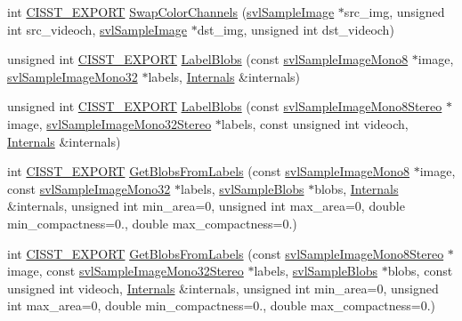 \begin{DoxyCompactItemize}
\item 
int \hyperlink{cmn_export_macros_8h_a99393e0c3ac434b2605235bbe20684f8}{C\+I\+S\+S\+T\+\_\+\+E\+X\+P\+O\+R\+T} \hyperlink{namespacesvl_image_processing_a454ae19ad32cfb837dd13169a01d5d99}{Swap\+Color\+Channels} (\hyperlink{classsvl_sample_image}{svl\+Sample\+Image} $\ast$src\+\_\+img, unsigned int src\+\_\+videoch, \hyperlink{classsvl_sample_image}{svl\+Sample\+Image} $\ast$dst\+\_\+img, unsigned int dst\+\_\+videoch)
\item 
unsigned int \hyperlink{cmn_export_macros_8h_a99393e0c3ac434b2605235bbe20684f8}{C\+I\+S\+S\+T\+\_\+\+E\+X\+P\+O\+R\+T} \hyperlink{namespacesvl_image_processing_ab67a8fcff51b4dbddda68a51697ea222}{Label\+Blobs} (const \hyperlink{svl_sample_image_types_8h_a812ff42c7181179f558b68c43eeacee5}{svl\+Sample\+Image\+Mono8} $\ast$image, \hyperlink{svl_sample_image_types_8h_ac5d9d107eabb65b55f67d2a70ccf2cd6}{svl\+Sample\+Image\+Mono32} $\ast$labels, \hyperlink{classsvl_image_processing_1_1_internals}{Internals} \&internals)
\item 
unsigned int \hyperlink{cmn_export_macros_8h_a99393e0c3ac434b2605235bbe20684f8}{C\+I\+S\+S\+T\+\_\+\+E\+X\+P\+O\+R\+T} \hyperlink{namespacesvl_image_processing_a03a2903ed508d4db0f8d21517d03344e}{Label\+Blobs} (const \hyperlink{svl_sample_image_types_8h_a40d6fa6c50215a4f52a8027a42eef1d9}{svl\+Sample\+Image\+Mono8\+Stereo} $\ast$image, \hyperlink{svl_sample_image_types_8h_a31510d38b03e3baeedb79e24fe3c7d0b}{svl\+Sample\+Image\+Mono32\+Stereo} $\ast$labels, const unsigned int videoch, \hyperlink{classsvl_image_processing_1_1_internals}{Internals} \&internals)
\item 
int \hyperlink{cmn_export_macros_8h_a99393e0c3ac434b2605235bbe20684f8}{C\+I\+S\+S\+T\+\_\+\+E\+X\+P\+O\+R\+T} \hyperlink{namespacesvl_image_processing_a6831b99429115d0e46283e0f423c4c6a}{Get\+Blobs\+From\+Labels} (const \hyperlink{svl_sample_image_types_8h_a812ff42c7181179f558b68c43eeacee5}{svl\+Sample\+Image\+Mono8} $\ast$image, const \hyperlink{svl_sample_image_types_8h_ac5d9d107eabb65b55f67d2a70ccf2cd6}{svl\+Sample\+Image\+Mono32} $\ast$labels, \hyperlink{classsvl_sample_blobs}{svl\+Sample\+Blobs} $\ast$blobs, \hyperlink{classsvl_image_processing_1_1_internals}{Internals} \&internals, unsigned int min\+\_\+area=0, unsigned int max\+\_\+area=0, double min\+\_\+compactness=0., double max\+\_\+compactness=0.)
\item 
int \hyperlink{cmn_export_macros_8h_a99393e0c3ac434b2605235bbe20684f8}{C\+I\+S\+S\+T\+\_\+\+E\+X\+P\+O\+R\+T} \hyperlink{namespacesvl_image_processing_ab99d41836ca0a0aac47b00a1c803bb76}{Get\+Blobs\+From\+Labels} (const \hyperlink{svl_sample_image_types_8h_a40d6fa6c50215a4f52a8027a42eef1d9}{svl\+Sample\+Image\+Mono8\+Stereo} $\ast$image, const \hyperlink{svl_sample_image_types_8h_a31510d38b03e3baeedb79e24fe3c7d0b}{svl\+Sample\+Image\+Mono32\+Stereo} $\ast$labels, \hyperlink{classsvl_sample_blobs}{svl\+Sample\+Blobs} $\ast$blobs, const unsigned int videoch, \hyperlink{classsvl_image_processing_1_1_internals}{Internals} \&internals, unsigned int min\+\_\+area=0, unsigned int max\+\_\+area=0, double min\+\_\+compactness=0., double max\+\_\+compactness=0.)

\end{DoxyCompactItemize}
